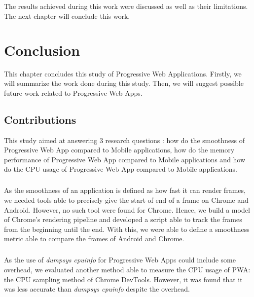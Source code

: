 \documentclass{kththesis}
\begin{document}
\paragraph{}
The results achieved during this work were discussed as well as their limitations. The next chapter will conclude this work. 


\chapter{Conclusion}

This chapter concludes this study of Progressive Web Applications. Firstly, we will summarize the work done during this study. Then, we will suggest possible future work related to Progressive Web Apps.

\section{Contributions}

This study aimed at answering 3 research questions : how do the smoothness of Progressive Web App compared to Mobile applications, how do the memory performance of Progressive Web App compared to Mobile applications and how do the CPU usage of Progressive Web App compared to Mobile applications.

\paragraph{}
As the smoothness of an application is defined as how fast it can render frames, we needed tools able to precisely give the start of end of a frame on Chrome and Android. However, no such tool were found for Chrome. Hence, we build a model of Chrome's rendering pipeline and developed a script able to track the frames from the beginning until the end. With this, we were able to define a smoothness metric able to compare the frames of Android and Chrome.

\paragraph{}
As the use of \textit{dumpsys cpuinfo} for Progressive Web Apps could include some overhead, we evaluated another method able to measure the CPU usage of PWA: the CPU sampling method of Chrome DevTools. However, it was found that it was less accurate than \textit{dumpsys cpuinfo} despite the overhead.
\end{document}
